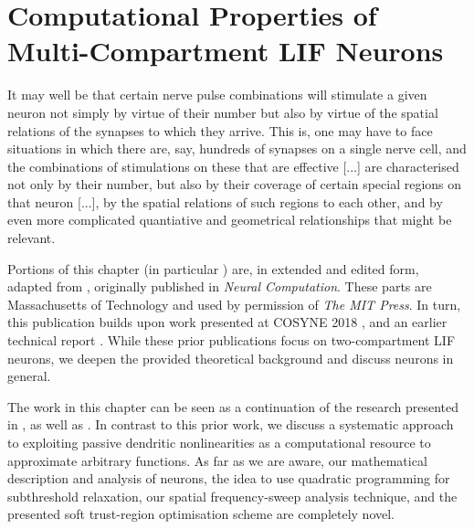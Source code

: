 \chapter{Computational Properties of Multi-Compartment LIF Neurons}
\label{chp:nlif}

\vspace{20pt}

\begin{OpeningQuote}
It may well be that certain nerve pulse combinations will stimulate a given neuron not simply by virtue of their number but also by virtue of the spatial relations of the synapses to which they arrive. This is, one may have to face situations in which there are, say, hundreds of synapses on a single nerve cell, and the combinations of stimulations on these that are effective [...] are characterised not only by their number, but also by their coverage of certain special regions on that neuron [...], by the spatial relations of such regions to each other, and by even more complicated quantiative and geometrical relationships that might be relevant.
\end{OpeningQuote}

\begin{PriorPublication}
Portions of this chapter (in particular ) are, in extended and edited form, adapted from \citet{stoeckel2021}, originally published in \emph{Neural Computation}. These parts are  Massachusetts of Technology and used by permission of \emph{The MIT Press}.
In turn, this publication builds upon work presented at COSYNE 2018 \citep{stockel2018nonlinear}, and an earlier technical report \citep{stockel2017point}.
While these prior publications focus on two-compartment LIF neurons, we deepen the provided theoretical background and discuss \nlif neurons in general.
\end{PriorPublication}

\begin{Contributions}
The work in this chapter can be seen as a continuation of the research presented in \citet[Chapter~5]{koch1999biophysics}, as well as \citet[Chapter~4]{tripp2009search}.
In contrast to this prior work, we discuss a systematic approach to exploiting passive dendritic nonlinearities as a computational resource to approximate arbitrary functions.
As far as we are aware, our mathematical description and analysis of \nlif neurons, the idea to use quadratic programming for subthreshold relaxation, our spatial frequency-sweep analysis technique, and the presented soft trust-region optimisation scheme are completely novel.
\end{Contributions}

